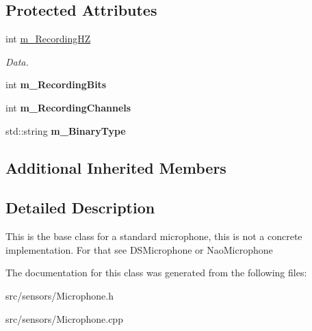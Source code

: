 \subsection*{Protected Attributes}
\begin{DoxyCompactItemize}
\item 
\mbox{\label{class_microphone_a7263061329ffc35acc2f772ac3f440b2}} 
int \hyperlink{class_microphone_a7263061329ffc35acc2f772ac3f440b2}{m\+\_\+\+Recording\+HZ}
\begin{DoxyCompactList}\small\item\em Data. \end{DoxyCompactList}\item 
\mbox{\label{class_microphone_a0cf269a9d9aecf4f2298cef4604b552d}} 
int {\bfseries m\+\_\+\+Recording\+Bits}
\item 
\mbox{\label{class_microphone_a5304521178fb390d380fc698c6dc6c3f}} 
int {\bfseries m\+\_\+\+Recording\+Channels}
\item 
\mbox{\label{class_microphone_ad51a9dabedae6c593ecfd87457882671}} 
std\+::string {\bfseries m\+\_\+\+Binary\+Type}
\end{DoxyCompactItemize}
\subsection*{Additional Inherited Members}


\subsection{Detailed Description}
This is the base class for a standard microphone, this is not a concrete implementation. For that see D\+S\+Microphone or Nao\+Microphone 

The documentation for this class was generated from the following files\+:\begin{DoxyCompactItemize}
\item 
src/sensors/Microphone.\+h\item 
src/sensors/Microphone.\+cpp\end{DoxyCompactItemize}

